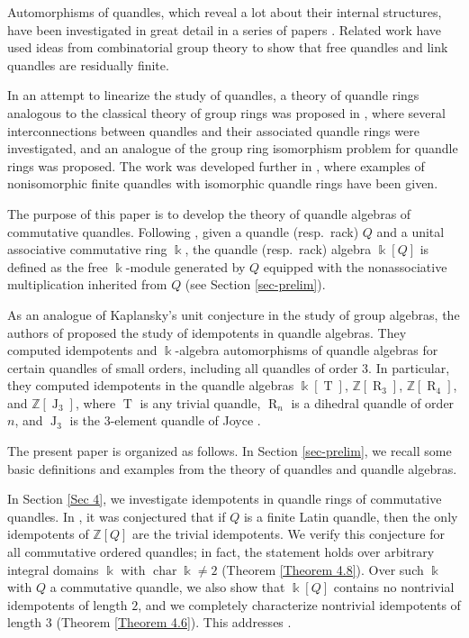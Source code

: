 \documentclass[12 pt]{amsart}
\theoremstyle{definition}
\theoremstyle{remark}
\numberwithin{equation}{section}
\newcommand{\T}{\operatorname{T}}
\newcommand{\R}{\operatorname{R}}
\renewcommand{\k}{\Bbbk}
\newcommand{\chara}{\operatorname{char}}
\begin{document}
Automorphisms of quandles, which reveal a lot about their internal structures, have been investigated in great detail in a series of papers \cite{BDS, BarTimSin, Elhamdadi2012}. Related work \cite{BSS1, BSS2} have used ideas from combinatorial group theory to show that free quandles and link quandles are residually finite.
\par

In an attempt to linearize the study of quandles, a theory of quandle rings analogous to the classical theory of group rings was proposed in \cite{BPS}, where several interconnections between quandles and their associated quandle rings were investigated, and an analogue of the group ring isomorphism problem for quandle rings was proposed. The work was developed further in \cite{EFT}, where examples of nonisomorphic finite quandles with isomorphic quandle rings have been given.
\par

The purpose of this paper is to develop the theory of quandle algebras of commutative quandles. Following \cite{BPS}, given a quandle (resp.\ rack) $Q$ and a unital associative commutative ring $\Bbbk$, the quandle (resp.\ rack) algebra $\Bbbk[Q]$ is defined as the free $\k$-module generated by $Q$ equipped with the nonassociative multiplication inherited from $Q$ (see  Section \ref{sec-prelim}).

As an analogue of Kaplansky's unit conjecture in the study of group algebras, the authors of \cite{BPS-1} proposed the study of idempotents in quandle algebras. They computed idempotents and $\Bbbk$-algebra automorphisms of quandle algebras for certain quandles of small orders, including all quandles of order $3$. In particular, they computed idempotents in the quandle algebras $\Bbbk[\T]$, $\mathbb{Z}[\R_3]$, $\mathbb{Z}[\R_4]$, and $\mathbb{Z}[\operatorname{J}_{3}]$, where $\T$ is any trivial quandle, $\R_n$ is a dihedral quandle of order $n$, and $\operatorname{J}_{3}$ is the 3-element quandle of Joyce \cite{Joyce-Thesis}. 
 
The present paper is organized as follows. In Section \ref{sec-prelim}, we recall some basic definitions and examples from the theory of quandles and quandle algebras. 
 
In Section \ref{Sec 4}, we investigate idempotents in quandle rings of commutative quandles. In \cite[Conj.\ 13.19]{BES}, it was conjectured that if $Q$ is a finite Latin quandle, then the only idempotents of $\mathbb{Z}[Q]$ are the trivial idempotents. We verify this conjecture for all commutative ordered quandles; in fact, the statement holds over arbitrary integral domains $\k$ with $\chara \k\neq 2$ (Theorem \ref{Theorem 4.8}). Over such $\k$ with $Q$ a commutative quandle, we also show that $\k[Q]$ contains no nontrivial idempotents of length $2$, and we completely characterize nontrivial idempotents of length $3$ (Theorem \ref{Theorem 4.6}). This addresses \cite[Conj.\ 3.10]{MBMD}.
\end{document}

